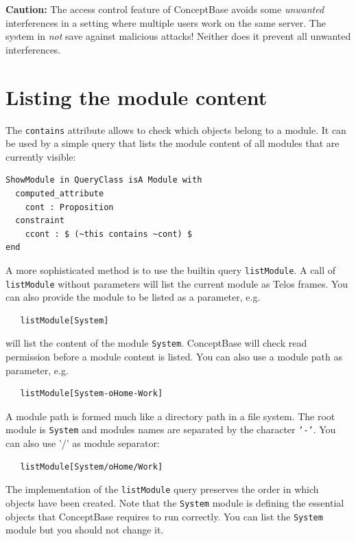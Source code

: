 {\bf Caution:} The access control feature of ConceptBase avoids
some {\em unwanted\/} interferences in a setting where multiple users
work on the same server. The system in {\em not\/} save against malicious attacks!
Neither does it prevent all unwanted interferences.



\section{Listing the module content} \label{sec:module_content}

The {\tt contains} attribute allows to check which objects belong to a module. It can be used
by a simple query that lists the module content of all modules that are currently visible:

\begin{verbatim}
ShowModule in QueryClass isA Module with
  computed_attribute
    cont : Proposition
  constraint
    ccont : $ (~this contains ~cont) $
end
\end{verbatim}

A more sophisticated method is to use the builtin query {\tt listModule}. A call of
{\tt listModule} without parameters will list the current module as Telos frames.
You can also provide the module to be listed as a parameter, e.g.

\begin{verbatim}
   listModule[System]
\end{verbatim}

will list the content of the module {\tt System}. ConceptBase will check
read permission before a module content is listed. You can also use
a module path as parameter, e.g.\ 

\begin{verbatim}
   listModule[System-oHome-Work]
\end{verbatim}

A module path is formed much like a directory path in a file system.
The root module is {\tt System} and modules names are separated by 
the character {\tt '-'}. You can also use '/' as module separator:
\begin{verbatim}
   listModule[System/oHome/Work]
\end{verbatim}

The implementation of the {\tt listModule} query preserves
the order in which objects have been created. Note that the {\tt System}
module is defining the essential objects that ConceptBase requires to
run correctly. You can list the {\tt System} module but you should
not change it. 

